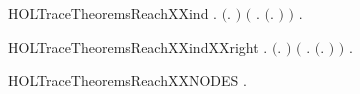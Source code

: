 \newcommand{\HOLTraceTheoremsReachXXcasesTwo}{\UseVerbatim{HOLTraceTheoremsReachXXcasesTwo}}
\begin{SaveVerbatim}{HOLTraceTheoremsReachXXind}
\HOLTokenTurnstile{} \HOLSymConst{\HOLTokenForall{}}.
       \ensuremath{(}\HOLSymConst{\HOLTokenForall{}}.   \ensuremath{)} \HOLSymConst{\HOLTokenConj{}} \ensuremath{(}\HOLSymConst{\HOLTokenForall{}}  . \ensuremath{(}\HOLSymConst{\HOLTokenExists{}}.  \HOLTokenTransBegin{}\HOLTokenTransEnd {}\ensuremath{)} \HOLSymConst{\HOLTokenConj{}}    \HOLSymConst{\HOLTokenImp{}}   \ensuremath{)} \HOLSymConst{\HOLTokenImp{}}
       \HOLSymConst{\HOLTokenForall{}} .    \HOLSymConst{\HOLTokenImp{}}   
\end{SaveVerbatim}
\newcommand{\HOLTraceTheoremsReachXXind}{\UseVerbatim{HOLTraceTheoremsReachXXind}}
\begin{SaveVerbatim}{HOLTraceTheoremsReachXXindXXright}
\HOLTokenTurnstile{} \HOLSymConst{\HOLTokenForall{}}.
       \ensuremath{(}\HOLSymConst{\HOLTokenForall{}}.   \ensuremath{)} \HOLSymConst{\HOLTokenConj{}} \ensuremath{(}\HOLSymConst{\HOLTokenForall{}}  .    \HOLSymConst{\HOLTokenConj{}} \ensuremath{(}\HOLSymConst{\HOLTokenExists{}}.  \HOLTokenTransBegin{}\HOLTokenTransEnd {}\ensuremath{)} \HOLSymConst{\HOLTokenImp{}}   \ensuremath{)} \HOLSymConst{\HOLTokenImp{}}
       \HOLSymConst{\HOLTokenForall{}} .    \HOLSymConst{\HOLTokenImp{}}   
\end{SaveVerbatim}
\newcommand{\HOLTraceTheoremsReachXXindXXright}{\UseVerbatim{HOLTraceTheoremsReachXXindXXright}}
\begin{SaveVerbatim}{HOLTraceTheoremsReachXXNODES}
\HOLTokenTurnstile{} \HOLSymConst{\HOLTokenForall{}} .    \HOLSymConst{\HOLTokenImp{}}  \HOLConst{\HOLTokenIn{}}  
\end{SaveVerbatim}
